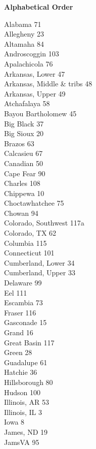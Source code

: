\documentclass[11pt]{article}
\begin{document}
\newpage
\thispagestyle{empty}
\begin{center}
	\textbf{Alphabetical Order}
\end{center}
\begin{multicols}{3}
Alabama 71\\
Allegheny 23\\
Altamaha 84\\
Androscoggin 103\\
Apalachicola 76\\
Arkansas, Lower 47\\
Arkansas, Middle \& tribs 48\\
Arkansas, Upper 49\\
Atchafalaya 58\\
Bayou Bartholomew 45\\
Big Black 37\\
Big Sioux 20\\
Brazos 63\\
Calcasieu 67\\
Canadian 50\\
Cape Fear 90\\
Charles 108\\
Chippewa 10\\
Choctawhatchee 75\\
Chowan 94\\
Colorado, Southwest 117a\\
Colorado, TX 62\\
Columbia 115\\
Connecticut 101\\
Cumberland, Lower 34\\
Cumberland, Upper 33\\
Delaware 99\\
Eel 111\\
Escambia 73\\
Fraser 116\\
Gasconade 15\\
Grand 16\\
Great Basin 117\\
Green 28\\
Guadalupe 61\\
Hatchie 36\\
Hillsborough 80\\
Hudson 100\\
Illinois, AR 53\\
Illinois, IL 3\\
Iowa 8\\
James, ND 19\\
JamsVA 95\\

\end{multicols}
\end{document}
